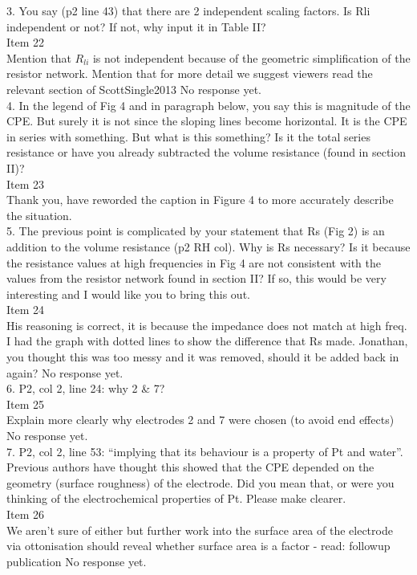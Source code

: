 \documentclass[journal, a4paper]{IEEEtran}
\begin{document}
{{3. You say (p2 line 43) that there are 2 independent scaling factors. Is Rli independent or not? If not, why input it in Table II?\\
{\color{OliveGreen}
    Item 22\\
    {\color{Red} Mention that $R_{li}$ is not independent because of the geometric simplification of the resistor network. Mention that for more detail we suggest viewers read the relevant section of ScottSingle2013}
    No response yet.
}\\

4. In the legend of Fig 4 and in paragraph below, you say this is magnitude of the CPE. But surely it is not since the sloping lines become horizontal. It is the CPE in series with something. But what is this something? Is it the total series resistance or have you already subtracted the volume resistance (found in section II)?\\
{\color{OliveGreen}
    Item 23\\
    Thank you, have reworded the caption in Figure 4 to more accurately describe the situation.
}\\

5. The previous point is complicated by your statement that Rs (Fig 2) is an addition to the volume resistance (p2 RH col). Why is Rs necessary? Is it because the resistance values at high frequencies in Fig 4 are not consistent with the values from the resistor network found in section II? If so, this would be very interesting and I would like you to bring this out.\\
{\color{OliveGreen} 
    Item 24\\
    {\color{Red} His reasoning is correct, it is because the impedance does not match at high freq. I had the graph with dotted lines to show the difference that Rs made. Jonathan, you thought this was too messy and it was removed, should it be added back in again?}
    No response yet.
}\\

6. P2, col 2, line 24: why 2 & 7?\\
{\color{OliveGreen}
    Item 25\\
    {\color{Red} Explain more clearly why electrodes 2 and 7 were chosen (to avoid end effects)}
    No response yet.
}\\

7. P2, col 2, line 53: ``implying that its behaviour is a property of Pt and water''. Previous authors have thought this showed that the CPE depended on the geometry (surface roughness) of the electrode. Did you mean that, or were you thinking of the electrochemical properties of Pt. Please make clearer.\\
{\color{OliveGreen}
    Item 26\\
    {\color{Red} We aren't sure of either but further work into the surface area of the electrode via ottonisation should reveal whether surface area is a factor - read: followup publication}
    No response yet.
}\\

}}
\end{document}

